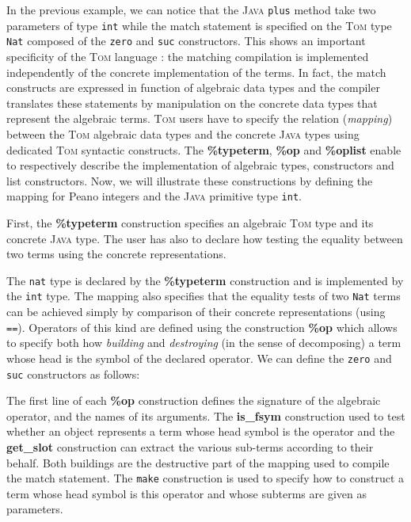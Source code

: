 \documentclass[runningheads]{llncs}
\newcommand{\tom}{\textsc{Tom}}
\newcommand{\java}{\textsc{Java}}
\newcommand{\lex}[1]{{\textrm{\textbf{#1}}}}
\begin{document}
In the previous example, we can notice that the {\java} \texttt{plus} method
take two parameters of type \texttt{int} while the match statement is specified
on the {\tom} type \texttt{Nat} composed of the \texttt{zero} and \texttt{suc}
constructors. This shows an important specificity of the {\tom} language : the
matching compilation is implemented independently of the concrete
implementation of the terms. In fact, the match constructs are expressed in
function of algebraic data types and the compiler translates these statements
by manipulation on the concrete data types that represent the algebraic terms.
{\tom} users have to specify the relation (\emph{mapping}) between the {\tom}
algebraic data types and the concrete {\java} types using dedicated {\tom}
syntactic constructs. The \lex{\%typeterm}, \lex{\%op} and \lex{\%oplist}
enable to respectively  describe the implementation of algebraic types,
constructors and list constructors. Now, we will illustrate these constructions
by defining the mapping for Peano integers and the {\java} primitive type
\texttt{int}.

First, the \lex{\%typeterm} construction specifies an algebraic {\tom} type and
its concrete {\java} type. The user has also to declare how testing the
equality between two terms using the concrete representations.

\medskip
{}

The \texttt{nat} type is declared by the \lex{\%typeterm} construction and is
implemented by the \texttt{int} type. The mapping also specifies that the
equality tests of two \texttt{Nat} terms can be achieved simply by comparison
of their concrete representations (using \texttt{==}). Operators of this kind
are defined using the construction \lex{\%op} which allows to specify both how
\emph{building} and \emph{destroying} (in the sense of decomposing) a term
whose head is the symbol of the declared operator. We can define the
\texttt{zero} and \texttt{suc} constructors as follows:


	
The first line of each \lex{\%op} construction defines the signature of the
algebraic operator, and the names of its arguments. The \lex{is\_fsym}
construction used to test whether an object represents a term whose head symbol
is the operator and the \lex{get\_slot} construction can extract the various
sub-terms according to their behalf. Both buildings are the destructive part of
the mapping used to compile the match statement.  The \texttt{make} construction
is used to specify how to construct a term whose head symbol is this operator
and whose subterms are given as parameters.
\end{document}
